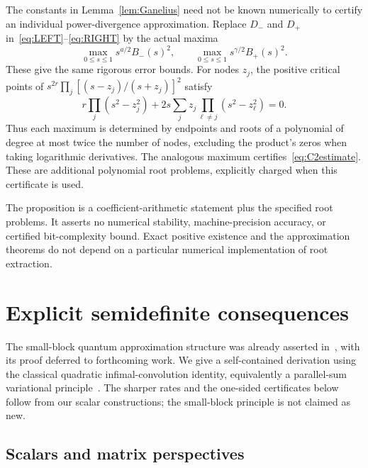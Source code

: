 \documentclass[11pt]{article}
\numberwithin{equation}{section}
\begin{document}
The constants in Lemma~\ref{lem:Ganelius} need not be known numerically
to certify an individual power-divergence approximation. Replace $D_-$
and $D_+$ in~\eqref{eq:LEFT}--\eqref{eq:RIGHT} by the actual maxima
\[
 \max_{0\le s\le1}s^{a/2}B_-(s)^2,
 \qquad \max_{0\le s\le1}s^{\gamma/2}B_+(s)^2.
\]
These give the same rigorous error bounds. For nodes $z_j$, the positive
critical points of $s^{2r}\prod_j[(s-z_j)/(s+z_j)]^2$ satisfy
\begin{equation}\label{eq:certificatePolynomial}
 r\prod_j(s^2-z_j^2)+2s\sum_j z_j
                       \prod_{\ell\ne j}(s^2-z_\ell^2)=0.
\end{equation}
Thus each maximum is determined by endpoints and roots of a polynomial
of degree at most twice the number of nodes, excluding the product's
zeros when taking logarithmic derivatives. The analogous maximum
certifies~\eqref{eq:C2estimate}. These are additional polynomial root
problems, explicitly charged when this certificate is used.

The proposition is a coefficient-arithmetic statement plus the specified
root problems. It asserts no numerical stability, machine-precision
accuracy, or certified bit-complexity bound. Exact positive existence
and the approximation theorems do not depend on a particular numerical
implementation of root extraction.

\section{Explicit semidefinite consequences}

The small-block quantum approximation structure was already asserted
in~\cite[Theorem~5]{FF}, with its proof deferred to forthcoming work.
We give a self-contained derivation using the classical quadratic
infimal-convolution identity, equivalently a parallel-sum variational
principle~\cite{AD}. The sharper rates and the one-sided certificates
below follow from our scalar constructions; the small-block principle
is not claimed as new.

\subsection{Scalars and matrix perspectives}
\end{document}
